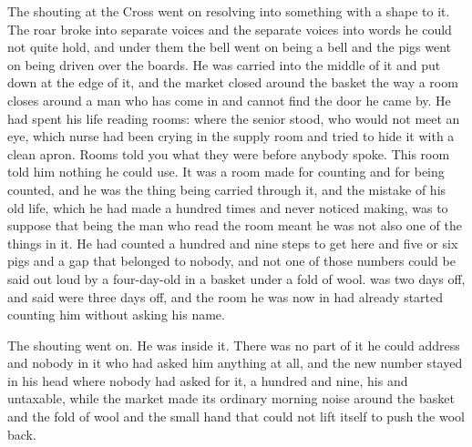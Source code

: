 The shouting at the Cross went on resolving into something with a shape to it. The roar broke into separate voices and the separate voices into words he could not quite hold, and under them the bell went on being a bell and the pigs went on being driven over the boards. He was carried into the middle of it and put down at the edge of it, and the market closed around the basket the way a room closes around a man who has come in and cannot find the door he came by. He had spent his life reading rooms: where the senior stood, who would not meet an eye, which nurse had been crying in the supply room and tried to hide it with a clean apron. Rooms told you what they were before anybody spoke. This room told him nothing he could use. It was a room made for counting and for being counted, and he was the thing being carried through it, and the mistake of his old life, which he had made a hundred times and never noticed making, was to suppose that being the man who read the room meant he was not also one of the things in it. He had counted a hundred and nine steps to get here and five or six pigs and a gap that belonged to nobody, and not one of those numbers could be said out loud by a four-day-old in a basket under a fold of wool.  was two days off, and  said  were three days off, and the room he was now in had already started counting him without asking his name.

The shouting went on. He was inside it. There was no part of it he could address and nobody in it who had asked him anything at all, and the new number stayed in his head where nobody had asked for it, a hundred and nine, his and untaxable, while the market made its ordinary morning noise around the basket and the fold of wool and the small hand that could not lift itself to push the wool back.
